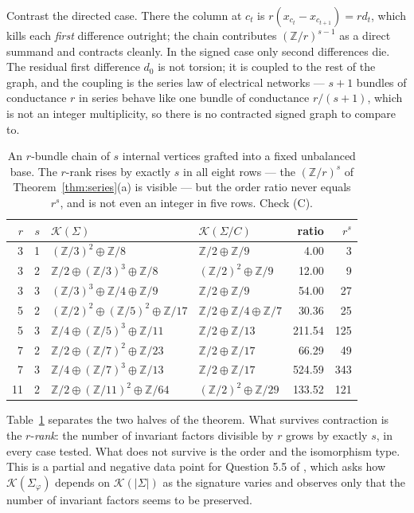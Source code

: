 \documentclass[11pt]{article}
\theoremstyle{plain}
\theoremstyle{definition}
\theoremstyle{remark}
\newcommand{\Z}{\mathbb{Z}}
\newcommand{\K}{\mathcal{K}}
\newcommand{\Sig}{\Sigma}
\begin{document}
Contrast the directed case. There the column at $c_t$ is $r(x_{c_t}-x_{c_{t+1}})=r d_t$,
which kills each \emph{first} difference outright; the chain contributes $(\Z/r)^{s-1}$ as a
direct summand and contracts cleanly. In the signed case only second differences die. The
residual first difference $d_0$ is not torsion; it is coupled to the rest of the graph, and
the coupling is the series law of electrical networks --- $s{+}1$ bundles of conductance $r$
in series behave like one bundle of conductance $r/(s{+}1)$, which is not an integer
multiplicity, so there is no contracted signed graph to compare to.

\begin{table}[t]
\centering
\begin{tabular}{rrllrr}
\toprule
$r$ & $s$ & $\K(\Sig)$ & $\K(\Sig/C)$ & ratio & $r^s$\\
\midrule
 3 & 1 & $(\Z/3)^2\oplus\Z/8$              & $\Z/2\oplus\Z/9$          &   4.00 &   3\\
 3 & 2 & $\Z/2\oplus(\Z/3)^3\oplus\Z/8$    & $(\Z/2)^2\oplus\Z/9$      &  12.00 &   9\\
 3 & 3 & $(\Z/3)^3\oplus\Z/4\oplus\Z/9$    & $\Z/2\oplus\Z/9$          &  54.00 &  27\\
 5 & 2 & $(\Z/2)^2\oplus(\Z/5)^2\oplus\Z/17$ & $\Z/2\oplus\Z/4\oplus\Z/7$ & 30.36 &  25\\
 5 & 3 & $\Z/4\oplus(\Z/5)^3\oplus\Z/11$   & $\Z/2\oplus\Z/13$         & 211.54 & 125\\
 7 & 2 & $\Z/2\oplus(\Z/7)^2\oplus\Z/23$   & $\Z/2\oplus\Z/17$         &  66.29 &  49\\
 7 & 3 & $\Z/4\oplus(\Z/7)^3\oplus\Z/13$   & $\Z/2\oplus\Z/17$         & 524.59 & 343\\
11 & 2 & $\Z/2\oplus(\Z/11)^2\oplus\Z/64$  & $(\Z/2)^2\oplus\Z/29$     & 133.52 & 121\\
\bottomrule
\end{tabular}
\caption{An $r$-bundle chain of $s$ internal vertices grafted into a fixed unbalanced base.
The $r$-rank rises by exactly $s$ in all eight rows --- the $(\Z/r)^s$ of
Theorem~\ref{thm:series}(a) is visible --- but the order ratio never equals $r^s$, and is
not even an integer in five rows. Check (C).}
\label{tab:series}
\end{table}

Table~\ref{tab:series} separates the two halves of the theorem. What survives contraction is
the $r$-\emph{rank}: the number of invariant factors divisible by $r$ grows by exactly $s$,
in every case tested. What does not survive is the order and the isomorphism type. This is a
partial and negative data point for Question 5.5 of \cite{CDIOSZ}, which asks how
$\K(\Sig_\varphi)$ depends on $\K(|\Sig|)$ as the signature varies and observes only that the
number of invariant factors seems to be preserved.
\end{document}
